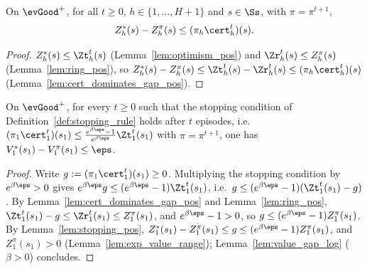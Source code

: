 \begin{lemma}\label{lem:stopping_pos}
\leanok
{}
On $\evGood^+$, for all $t \ge 0$, $h \in \{1, \dots, H + 1\}$ and $s \in \Ss$, with $\pi = \pi^{t+1}$,
\[
  Z^*_h(s) - Z^\pi_h(s) \le (\pi_h\cert_h^t)(s) .
\]
\end{lemma}

\begin{proof}
\leanok
$Z^*_h(s) \le \Zt_h^t(s)$ (Lemma~\ref{lem:optimism_pos}) and $\Zr_h^t(s) \le Z^\pi_h(s)$
(Lemma~\ref{lem:ring_pos}), so $Z^*_h(s) - Z^\pi_h(s) \le \Zt_h^t(s) - \Zr_h^t(s) \le (\pi_h\cert_h^t)(s)$
(Lemma~\ref{lem:cert_dominates_gap_pos}).
\end{proof}

\begin{lemma}\label{lem:pac_at_stopping_pos}
\leanok
{}
On $\evGood^+$, for every $t \ge 0$ such that the stopping condition of
Definition~\ref{def:stopping_rule} holds after $t$ episodes, i.e.\
$(\pi_1\cert_1^t)(s_1) \le \frac{e^{\beta\eps} - 1}{e^{\beta\eps}}\Zt_1^t(s_1)$ with $\pi = \pi^{t+1}$,
one has $V^*_1(s_1) - V^\pi_1(s_1) \le \eps$.
\end{lemma}

\begin{proof}
\leanok
Write $g := (\pi_1\cert_1^t)(s_1) \ge 0$. Multiplying the stopping condition by $e^{\beta\eps} > 0$
gives $e^{\beta\eps} g \le (e^{\beta\eps} - 1)\Zt_1^t(s_1)$, i.e.\ $g \le (e^{\beta\eps} - 1)(\Zt_1^t(s_1) - g)$.
By Lemma~\ref{lem:cert_dominates_gap_pos} and Lemma~\ref{lem:ring_pos},
$\Zt_1^t(s_1) - g \le \Zr_1^t(s_1) \le Z^\pi_1(s_1)$, and $e^{\beta\eps} - 1 > 0$, so
$g \le (e^{\beta\eps} - 1) Z^\pi_1(s_1)$. By Lemma~\ref{lem:stopping_pos},
$Z^*_1(s_1) - Z^\pi_1(s_1) \le g \le (e^{\beta\eps} - 1)Z^\pi_1(s_1)$, and $Z^\pi_1(s_1) > 0$
(Lemma~\ref{lem:exp_value_range}); Lemma~\ref{lem:value_gap_log} ($\beta > 0$) concludes.
\end{proof}

